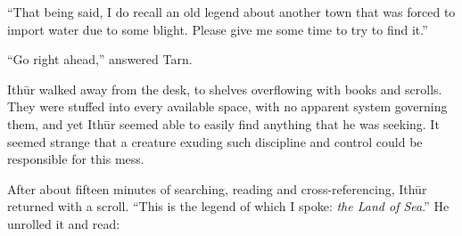 ``That being said, I do recall an old legend about another town that was forced to import water due to some blight.  Please give me some time to try to find it.''

``Go right ahead,'' answered Tarn.

Ith\=ur walked away from the desk, to shelves overflowing with books and scrolls.  They were stuffed into every available space, with no apparent system governing them, and yet Ith\=ur seemed able to easily find anything that he was seeking.  It seemed strange that a creature exuding such discipline and control could be responsible for this mess.

After about fifteen minutes of searching, reading and cross-referencing, Ith\=ur returned with a scroll.  ``This is the legend of which I spoke: \emph{the Land of Sea}.''  He unrolled it and read:

